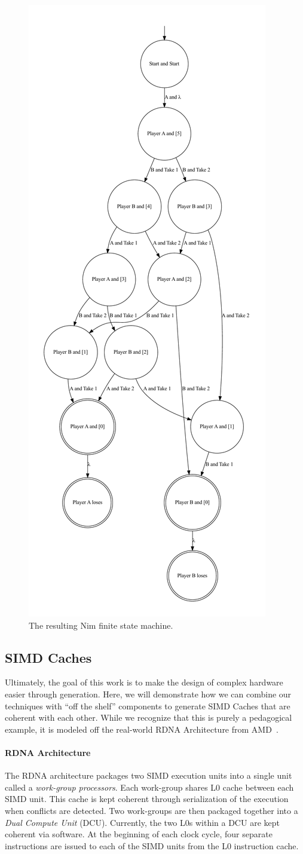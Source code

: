 \documentclass[sigplan,anonymous,review]{acmart}
\begin{document}
\begin{figure}
    \centering
    \includegraphics[width=0.35\linewidth]{figures/nimexample/nimFSM.pdf}
    \caption{The resulting Nim finite state machine.}
    \label{fig:nimFSM}
\end{figure}

\subsection{SIMD Caches}\label{sec:cache}
Ultimately, the goal of this work is to make the design of complex hardware easier through generation. Here, we will demonstrate how we can combine our techniques with ``off the shelf'' components to generate SIMD Caches that are coherent with each other. While we recognize that this is purely a pedagogical example, it is modeled off the real-world RDNA Architecture from AMD~\cite{}.

\paragraph{RDNA Architecture} The RDNA architecture packages two SIMD execution units into a single unit called a \textit{work-group processors}. Each work-group shares L0 cache between each SIMD unit. This cache is kept coherent through serialization of the execution when conflicts are detected. Two work-groups are then packaged together into a \textit{Dual Compute Unit} (DCU). Currently, the two L0s within a DCU are kept coherent via software. At the beginning of each clock cycle, four separate instructions are issued to each of the SIMD units from the L0 instruction cache.
\end{document}

